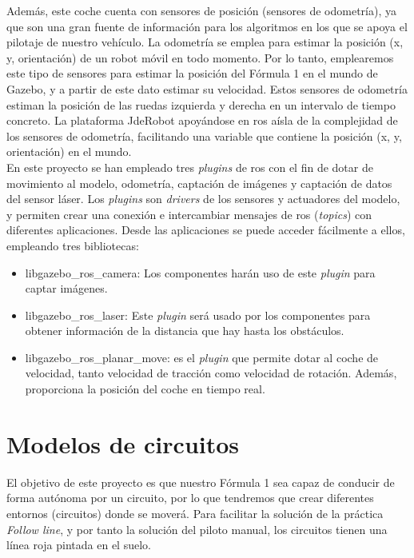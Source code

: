 Además, este coche cuenta con sensores de posición (sensores de odometría), ya que son una gran fuente de información para los algoritmos en los que se apoya el pilotaje de nuestro vehículo. La odometría se emplea para estimar la posición (x, y, orientación) de un robot móvil en todo momento. Por lo tanto, emplearemos este tipo de sensores para estimar la posición del Fórmula 1 en el mundo de Gazebo, y a partir de este dato estimar su velocidad. Estos sensores de odometría estiman la posición de las ruedas izquierda y derecha en un intervalo de tiempo concreto. La plataforma JdeRobot apoyándose en \acrshort{ros} aísla de la complejidad de los sensores de odometría, facilitando una variable que contiene la posición (x, y, orientación) en el mundo.\\

En este proyecto se han empleado tres \textit{plugins} de \acrshort{ros} con el fin de dotar de movimiento al modelo, odometría, captación de imágenes y captación de datos del sensor láser. Los \textit{plugins} son \textit{drivers} de los sensores y actuadores del modelo, y permiten crear una conexión e intercambiar mensajes de \acrshort{ros} (\textit{topics}) con diferentes aplicaciones. Desde las aplicaciones se puede acceder fácilmente a ellos, empleando tres bibliotecas:\\

\begin{itemize}
    \item libgazebo\_ros\_camera: Los componentes harán uso de este \textit{plugin} para captar imágenes.
    
    \item libgazebo\_ros\_laser: Este \textit{plugin} será usado por los componentes para obtener información de la distancia que hay hasta los obstáculos.
    
    \item libgazebo\_ros\_planar\_move: es el \textit{plugin} que permite dotar al coche de velocidad, tanto velocidad de tracción como velocidad de rotación. Además, proporciona la posición del coche en tiempo real.
\end{itemize}


\section{Modelos de circuitos}\label{modelos_circuitos}

El objetivo de este proyecto es que nuestro Fórmula 1 sea capaz de conducir de forma autónoma por un circuito, por lo que tendremos que crear diferentes entornos (circuitos) donde se moverá. Para facilitar la solución de la práctica \textit{Follow line}, y por tanto la solución del piloto manual, los circuitos tienen una línea roja pintada en el suelo.\\

